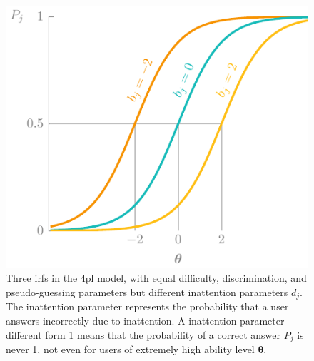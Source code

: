 \begin{figure}
    \centering
    \includegraphics[page=5]{03-education/figures/tikzfigures.pdf}
    \caption[Item response functions of the 4PL model]{Three \glspl{irf} in the \gls{4pl} model, with equal difficulty, discrimination, and pseudo-guessing parameters but different inattention parameters $d_j$. The inattention parameter represents the probability that a user answers incorrectly due to inattention. A inattention parameter different form 1 means that the probability of a correct answer $P_j$ is never 1, not even for users of extremely high ability level $\bm\theta$.}
    \label{fig:4pl}
\end{figure}

